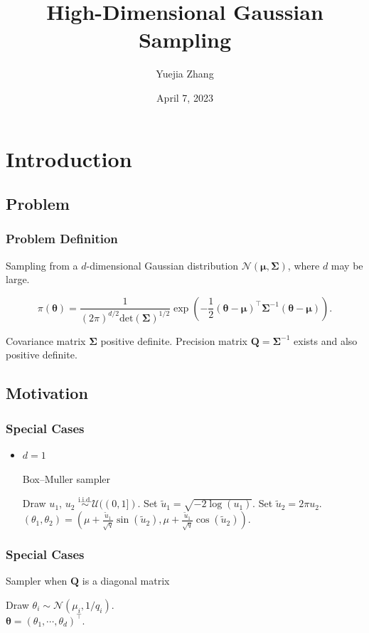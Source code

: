 \documentclass[aspectratio=169]{beamer}
\title{High-Dimensional Gaussian Sampling}
\author{Yuejia Zhang}
\date{April 7, 2023}
\newcommand{\B}[1]{\mathbf{#1}} %
\newcommand{\Bs}[1]{\boldsymbol{#1}} %
\newcommand{\pr}[1]{\left(#1\right)} %
\begin{document}
	
\begin{frame}
    \maketitle
\end{frame}

\section{Introduction} 
\subsection{Problem}
\begin{frame}
\frametitle{Problem Definition}
Sampling from a \(d\)-dimensional Gaussian distribution \(\mathcal{N}\pr{\Bs{\mu},\B{\Sigma}}\), where \(d\) may be large.

\[
    \pi(\Bs{\theta}) = \dfrac{1}{(2\pi)^{d/2}\text{det}(\B{\Sigma})^{1/2}}\exp\pr{-\dfrac{1}{2}(\Bs{\theta}-\Bs{\mu})^{\top}\B{\Sigma}^{-1}(\Bs{\theta}-\Bs{\mu})}.
\]

Covariance matrix \(\B{\Sigma}\) positive definite. Precision matrix \(\B{Q}=\B{\Sigma}^{-1}\) exists and also positive definite.
\end{frame}

\subsection{Motivation}
\begin{frame}
\frametitle{Special Cases}
\begin{itemize}
\item \(d = 1\)
\begin{algorithm}[H]
\caption{Box--Muller sampler}
\begin{algorithmic}[1]
\State Draw $u_1$, $u_2$ $\overset{\text{i.i.d.}}{\sim} \mathcal{U}((0,1])$.
\State Set $\tilde{u}_1 = \sqrt{-2\log(u_1)}$.
\State Set $\tilde{u}_2 = 2\pi u_2$.\\ 
\Return $(\theta_1,\theta_2) = \pr{\mu + \frac{\tilde{u}_1}{\sqrt{q}} \sin(\tilde{u}_2),\mu + \frac{\tilde{u}_1}{\sqrt{q}} \cos(\tilde{u}_2)}$.
\end{algorithmic}
\end{algorithm}
\end{itemize}
\end{frame}

\begin{frame}
\frametitle{Special Cases}
\begin{algorithm}[H]
\caption{Sampler when $\B{Q}$ is a diagonal matrix}
\label{algo:multi_diag}
\begin{algorithmic}[1]
 \Comment{\textcolor{blue}{In some programming languages, this loop can be vectorized.}} 
\State Draw $\displaystyle{\theta_i \sim \mathcal{N}\pr{\mu_i,1/q_i}}$.
\EndFor\\
\Return $\Bs{\theta} = (\theta_1,\cdots,\theta_d)^{\top}$.
\end{algorithmic}
\end{algorithm}
\end{frame}
\end{document}
